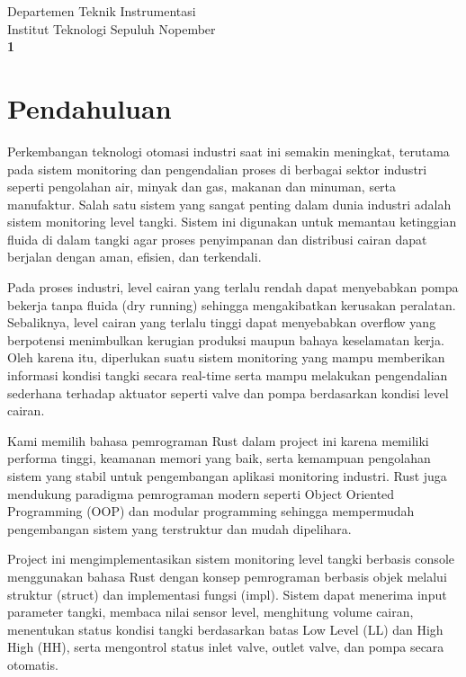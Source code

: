 \documentclass[12pt,a4paper]{article}
\begin{document}
\begin{titlepage}
    \vfill
    
    {\large Departemen Teknik Instrumentasi} \\[0.1cm]
    {\large Institut Teknologi Sepuluh Nopember} \\[1cm]
    
    \textbf{1} 
\end{titlepage}

\newpage
\tableofcontents
\newpage


\section{Pendahuluan}
Perkembangan teknologi otomasi industri saat ini semakin meningkat, terutama pada sistem monitoring dan pengendalian proses di berbagai sektor industri seperti pengolahan air, minyak dan gas, makanan dan minuman, serta manufaktur. Salah satu sistem yang sangat penting dalam dunia industri adalah sistem monitoring level tangki. Sistem ini digunakan untuk memantau ketinggian fluida di dalam tangki agar proses penyimpanan dan distribusi cairan dapat berjalan dengan aman, efisien, dan terkendali.

Pada proses industri, level cairan yang terlalu rendah dapat menyebabkan pompa bekerja tanpa fluida (dry running) sehingga mengakibatkan kerusakan peralatan. Sebaliknya, level cairan yang terlalu tinggi dapat menyebabkan overflow yang berpotensi menimbulkan kerugian produksi maupun bahaya keselamatan kerja. Oleh karena itu, diperlukan suatu sistem monitoring yang mampu memberikan informasi kondisi tangki secara real-time serta mampu melakukan pengendalian sederhana terhadap aktuator seperti valve dan pompa berdasarkan kondisi level cairan.

Kami memilih bahasa pemrograman Rust dalam project ini karena memiliki performa tinggi, keamanan memori yang baik, serta kemampuan pengolahan sistem yang stabil untuk pengembangan aplikasi monitoring industri. Rust juga mendukung paradigma pemrograman modern seperti Object Oriented Programming (OOP) dan modular programming sehingga mempermudah pengembangan sistem yang terstruktur dan mudah dipelihara.

Project ini mengimplementasikan sistem monitoring level tangki berbasis console menggunakan bahasa Rust dengan konsep pemrograman berbasis objek melalui struktur (struct) dan implementasi fungsi (impl). Sistem dapat menerima input parameter tangki, membaca nilai sensor level, menghitung volume cairan, menentukan status kondisi tangki berdasarkan batas Low Level (LL) dan High High (HH), serta mengontrol status inlet valve, outlet valve, dan pompa secara otomatis.
\end{document}
